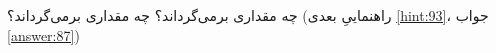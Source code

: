 \section{}
\paragraph{}\label{hint:163}
 چه مقداری برمی‌گرداند؟  چه مقداری برمی‌گرداند؟ (راهنماییِ بعدی \ref{hint:93}، جواب \ref{answer:87})